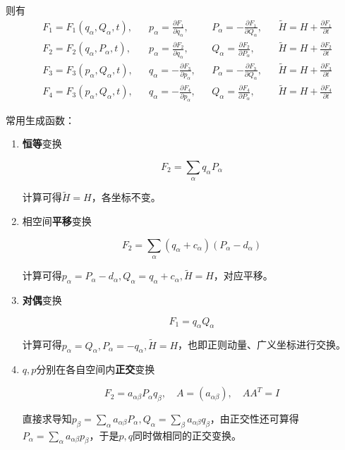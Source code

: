\documentclass[a4paper,UTF8,fontset=windows]{ctexart}
\begin{document}
则有
$$\begin{aligned}
    &F_1=F_1(q_\alpha,Q_\alpha,t),&&p_\alpha=\frac{\partial F_1}{\partial q_\alpha},&&P_\alpha=-\frac{\partial F_1}{\partial Q_\alpha},&&\tilde{H}=H+\frac{\partial F_1}{\partial t}\\[6pt]
    &F_2=F_2(q_\alpha,P_\alpha,t),&&p_\alpha=\frac{\partial F_2}{\partial q_\alpha},&&Q_\alpha=\frac{\partial F_2}{\partial P_\alpha},&&\tilde{H}=H+\frac{\partial F_2}{\partial t}\\[6pt]
    &F_3=F_3(p_\alpha,Q_\alpha,t),&&q_\alpha=-\frac{\partial F_3}{\partial p_\alpha},&&P_\alpha=-\frac{\partial F_3}{\partial Q_\alpha},&&\tilde{H}=H+\frac{\partial F_3}{\partial t}\\[6pt]
    &F_4=F_3(p_\alpha,Q_\alpha,t),&&q_\alpha=-\frac{\partial F_4}{\partial p_\alpha},&&Q_\alpha=\frac{\partial F_4}{\partial P_\alpha},&&\tilde{H}=H+\frac{\partial F_4}{\partial t}
\end{aligned}$$

常用生成函数：
\begin{enumerate}
    \item \textbf{恒等}变换
    
    $$F_2=\sum_\alpha q_\alpha P_\alpha$$
    
    计算可得$\tilde{H}=H$，各坐标不变。

    \item 相空间\textbf{平移}变换
    
    $$F_2=\sum_\alpha(q_\alpha+c_\alpha)(P_\alpha-d_\alpha)$$

    计算可得$p_\alpha=P_\alpha-d_\alpha,Q_\alpha=q_\alpha+c_\alpha,\tilde{H}=H$，对应平移。

    \item \textbf{对偶}变换
    
    $$F_1=q_\alpha Q_\alpha$$

    计算可得$p_\alpha=Q_\alpha,P_\alpha=-q_\alpha,\tilde{H}=H$，也即正则动量、广义坐标进行交换。

    \item $q,p$分别在各自空间内\textbf{正交}变换
    
    $$F_2=a_{\alpha\beta}P_\alpha q_\beta,\quad A=(a_{\alpha\beta}),\quad AA^T=I$$

    直接求导知$p_\beta=\sum_\alpha a_{\alpha\beta}P_\alpha,Q_\alpha=\sum_\beta a_{\alpha\beta}q_\beta$，由正交性还可算得$P_\alpha=\sum_\alpha a_{\alpha\beta}p_\beta$，于是$p,q$同时做相同的正交变换。
\end{enumerate}
\end{document}
